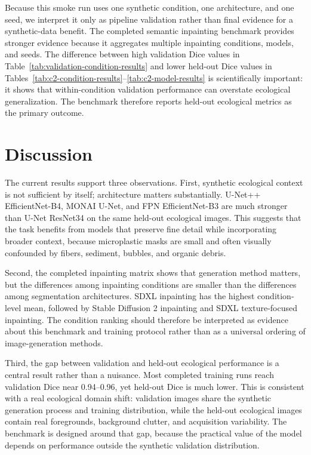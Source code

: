 \documentclass{article}
\begin{document}
Because this smoke run uses one synthetic condition, one architecture, and one seed, we interpret it only as pipeline validation rather than final evidence for a synthetic-data benefit. The completed semantic inpainting benchmark provides stronger evidence because it aggregates multiple inpainting conditions, models, and seeds. The difference between high validation Dice values in Table~\ref{tab:validation-condition-results} and lower held-out Dice values in Tables~\ref{tab:c2-condition-results}--\ref{tab:c2-model-results} is scientifically important: it shows that within-condition validation performance can overstate ecological generalization. The benchmark therefore reports held-out ecological metrics as the primary outcome.

\section{Discussion}

The current results support three observations. First, synthetic ecological context is not sufficient by itself; architecture matters substantially. U-Net++ EfficientNet-B4, MONAI U-Net, and FPN EfficientNet-B3 are much stronger than U-Net ResNet34 on the same held-out ecological images. This suggests that the task benefits from models that preserve fine detail while incorporating broader context, because microplastic masks are small and often visually confounded by fibers, sediment, bubbles, and organic debris.

Second, the completed inpainting matrix shows that generation method matters, but the differences among inpainting conditions are smaller than the differences among segmentation architectures. SDXL inpainting has the highest condition-level mean, followed by Stable Diffusion 2 inpainting and SDXL texture-focused inpainting. The condition ranking should therefore be interpreted as evidence about this benchmark and training protocol rather than as a universal ordering of image-generation methods.

Third, the gap between validation and held-out ecological performance is a central result rather than a nuisance. Most completed training runs reach validation Dice near 0.94--0.96, yet held-out Dice is much lower. This is consistent with a real ecological domain shift: validation images share the synthetic generation process and training distribution, while the held-out ecological images contain real foregrounds, background clutter, and acquisition variability. The benchmark is designed around that gap, because the practical value of the model depends on performance outside the synthetic validation distribution.
\end{document}
